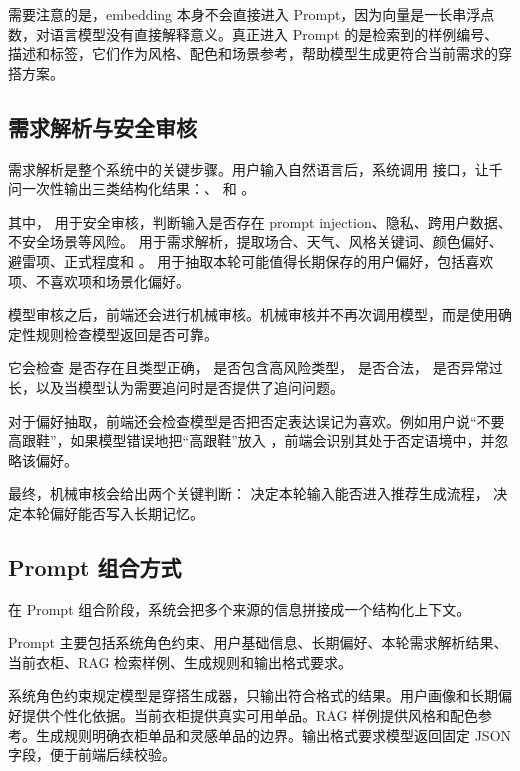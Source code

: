 \documentclass{applemlr}
\begin{document}
需要注意的是，embedding 本身不会直接进入 Prompt，因为向量是一长串浮点数，对语言模型没有直接解释意义。真正进入 Prompt 的是检索到的样例编号、描述和标签，它们作为风格、配色和场景参考，帮助模型生成更符合当前需求的穿搭方案。

\subsection{需求解析与安全审核}

需求解析是整个系统中的关键步骤。用户输入自然语言后，系统调用  接口，让千问一次性输出三类结构化结果：、 和 。

其中， 用于安全审核，判断输入是否存在 prompt injection、隐私、跨用户数据、不安全场景等风险。 用于需求解析，提取场合、天气、风格关键词、颜色偏好、避雷项、正式程度和 。 用于抽取本轮可能值得长期保存的用户偏好，包括喜欢项、不喜欢项和场景化偏好。

模型审核之后，前端还会进行机械审核。机械审核并不再次调用模型，而是使用确定性规则检查模型返回是否可靠。

它会检查  是否存在且类型正确， 是否包含高风险类型， 是否合法， 是否异常过长，以及当模型认为需要追问时是否提供了追问问题。

对于偏好抽取，前端还会检查模型是否把否定表达误记为喜欢。例如用户说``不要高跟鞋''，如果模型错误地把``高跟鞋''放入 ，前端会识别其处于否定语境中，并忽略该偏好。

最终，机械审核会给出两个关键判断： 决定本轮输入能否进入推荐生成流程， 决定本轮偏好能否写入长期记忆。

\subsection{Prompt 组合方式}

在 Prompt 组合阶段，系统会把多个来源的信息拼接成一个结构化上下文。

Prompt 主要包括系统角色约束、用户基础信息、长期偏好、本轮需求解析结果、当前衣柜、RAG 检索样例、生成规则和输出格式要求。

系统角色约束规定模型是穿搭生成器，只输出符合格式的结果。用户画像和长期偏好提供个性化依据。当前衣柜提供真实可用单品。RAG 样例提供风格和配色参考。生成规则明确衣柜单品和灵感单品的边界。输出格式要求模型返回固定 JSON 字段，便于前端后续校验。
\end{document}
